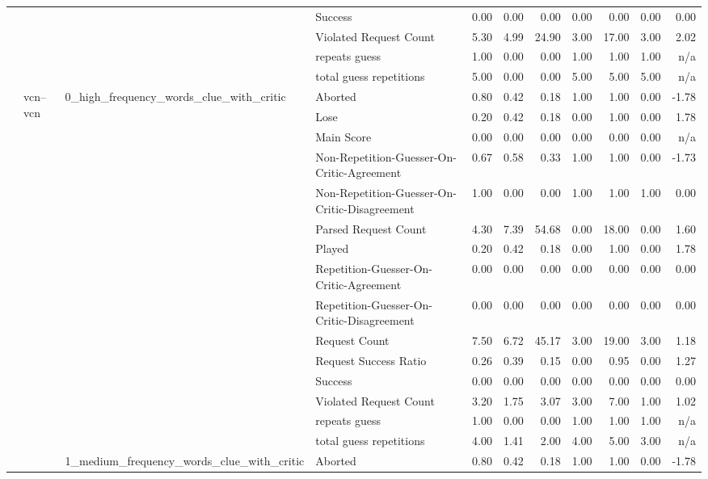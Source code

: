\begin{tabular}{llllrrrrrrr}
 &  &  & Success & 0.00 & 0.00 & 0.00 & 0.00 & 0.00 & 0.00 & 0.00 \\
 &  &  & Violated Request Count & 5.30 & 4.99 & 24.90 & 3.00 & 17.00 & 3.00 & 2.02 \\
 &  &  & repeats guess & 1.00 & 0.00 & 0.00 & 1.00 & 1.00 & 1.00 & n/a \\
 &  &  & total guess repetitions & 5.00 & 0.00 & 0.00 & 5.00 & 5.00 & 5.00 & n/a \\
\cline{2-11} \cline{3-11}
 & \multirow[t]{45}{*}{vcn--vcn} & \multirow[t]{15}{*}{0_high_frequency_words_clue_with_critic} & Aborted & 0.80 & 0.42 & 0.18 & 1.00 & 1.00 & 0.00 & -1.78 \\
 &  &  & Lose & 0.20 & 0.42 & 0.18 & 0.00 & 1.00 & 0.00 & 1.78 \\
 &  &  & Main Score & 0.00 & 0.00 & 0.00 & 0.00 & 0.00 & 0.00 & n/a \\
 &  &  & Non-Repetition-Guesser-On-Critic-Agreement & 0.67 & 0.58 & 0.33 & 1.00 & 1.00 & 0.00 & -1.73 \\
 &  &  & Non-Repetition-Guesser-On-Critic-Disagreement & 1.00 & 0.00 & 0.00 & 1.00 & 1.00 & 1.00 & 0.00 \\
 &  &  & Parsed Request Count & 4.30 & 7.39 & 54.68 & 0.00 & 18.00 & 0.00 & 1.60 \\
 &  &  & Played & 0.20 & 0.42 & 0.18 & 0.00 & 1.00 & 0.00 & 1.78 \\
 &  &  & Repetition-Guesser-On-Critic-Agreement & 0.00 & 0.00 & 0.00 & 0.00 & 0.00 & 0.00 & 0.00 \\
 &  &  & Repetition-Guesser-On-Critic-Disagreement & 0.00 & 0.00 & 0.00 & 0.00 & 0.00 & 0.00 & 0.00 \\
 &  &  & Request Count & 7.50 & 6.72 & 45.17 & 3.00 & 19.00 & 3.00 & 1.18 \\
 &  &  & Request Success Ratio & 0.26 & 0.39 & 0.15 & 0.00 & 0.95 & 0.00 & 1.27 \\
 &  &  & Success & 0.00 & 0.00 & 0.00 & 0.00 & 0.00 & 0.00 & 0.00 \\
 &  &  & Violated Request Count & 3.20 & 1.75 & 3.07 & 3.00 & 7.00 & 1.00 & 1.02 \\
 &  &  & repeats guess & 1.00 & 0.00 & 0.00 & 1.00 & 1.00 & 1.00 & n/a \\
 &  &  & total guess repetitions & 4.00 & 1.41 & 2.00 & 4.00 & 5.00 & 3.00 & n/a \\
\cline{3-11}
 &  & \multirow[t]{15}{*}{1_medium_frequency_words_clue_with_critic} & Aborted & 0.80 & 0.42 & 0.18 & 1.00 & 1.00 & 0.00 & -1.78 \\

\end{tabular}
